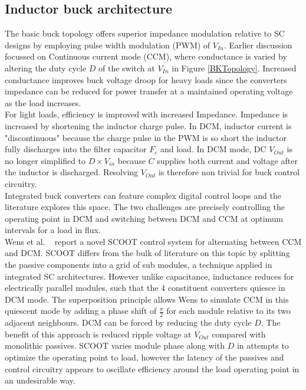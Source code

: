\documentclass[letterpaper,twocolumn,10pt]{article}
\begin{document}
\subsection{Inductor buck architecture}
The basic buck topology offers superior impedance modulation relative to SC designs by employing pulse width modulation (PWM) of $V_{In}$. Earlier discussion focussed on Continuous current mode (CCM), where conductance is varied by altering the duty cycle $D$ of the switch at $V_{In}$ in Figure \ref{BKTopology}. Increased conductance improves buck voltage droop for heavy loads since the converters impedance can be reduced for power transfer at a maintained operating voltage as the load increases.\\
For light loads, efficiency is improved with increased Impedance. Impedance is increased by shortening the inductor charge pulse. In DCM, inductor current is "discontinuous" because the charge pulse in the PWM is so short the inductor fully discharges into the filter capacitor $F_c$ and load. In DCM mode, DC $V_{Out}$ is no longer simplified to $D \times V_{in}$ because $C$ supplies both current and voltage after the inductor is discharged. Resolving $V_{Out}$ is therefore non trivial for buck control circuitry.\\
\indent Integrated buck converters can feature complex digital control loops and the literature explores this space. The two challenges are precisely controlling the operating point in DCM and switching between DCM and CCM at optimum intervals for a load in flux.\\
Wens et al. ~\cite{Wens2011} report a novel SCOOT control system for alternating between CCM and DCM. SCOOT differs from the bulk of literature on this topic by splitting the passive components into a grid of sub modules, a technique applied in integrated SC architectures. However unlike capacitance, inductance reduces for electrically parallel modules, such that the 4 constituent converters quiesce in DCM mode. The superposition principle allows Wens to simulate CCM in this quiescent mode by adding a phase shift of $\frac{\pi}{2}$ for each module relative to its two adjacent neighbours. DCM can be forced by reducing the duty cycle $D$. The benefit of this approach is reduced ripple voltage at $V_{Out}$ compared with monolithic passives. SCOOT varies module phase along with $D$ in attempts to optimize the operating point to load, however the latency of the passives and control circuitry appears to oscillate efficiency around the load operating point in an undesirable way.\\
\end{document}
